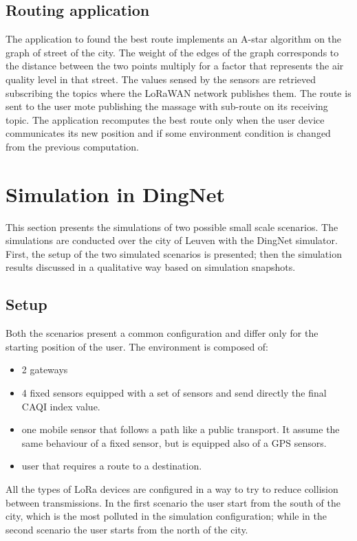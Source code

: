 \subsection*{Routing application}
The application to found the best route implements an A-star algorithm on the graph of street of the city. 
The weight of the edges of the graph corresponds to the distance between the two points multiply for a factor that represents the air quality level in that street. 
The values sensed by the sensors are retrieved subscribing the topics where the LoRaWAN network publishes them. 
The route is sent to the user mote publishing the massage with sub-route on its receiving topic.
The application recomputes the best route only when the user device communicates its new position and if some environment condition is changed from the previous computation.

\section{Simulation in DingNet}

This section presents the simulations of two possible small scale scenarios. 
The simulations are conducted over the city of Leuven with the DingNet simulator.
First, the setup of the two simulated scenarios is presented; then the simulation results discussed in a qualitative way based on simulation snapshots.

\subsection{Setup}
Both the scenarios present a common configuration and differ only for the starting position of the user.
The environment is composed of:
\begin{itemize}
    \item 2 gateways
    \item 4 fixed sensors equipped with a set of sensors and send directly the final CAQI index value.
    \item one mobile sensor that follows a path like a public transport. It assume the same behaviour of a fixed sensor, but is equipped also of a GPS sensors.
    \item user that requires a route to a destination.
\end{itemize} 
All the types of LoRa devices are configured in a way to try to reduce collision between transmissions.
In the first scenario the user start from the south of the city, which is the most polluted in the simulation configuration; while in the second scenario the user starts from the north of the city.

